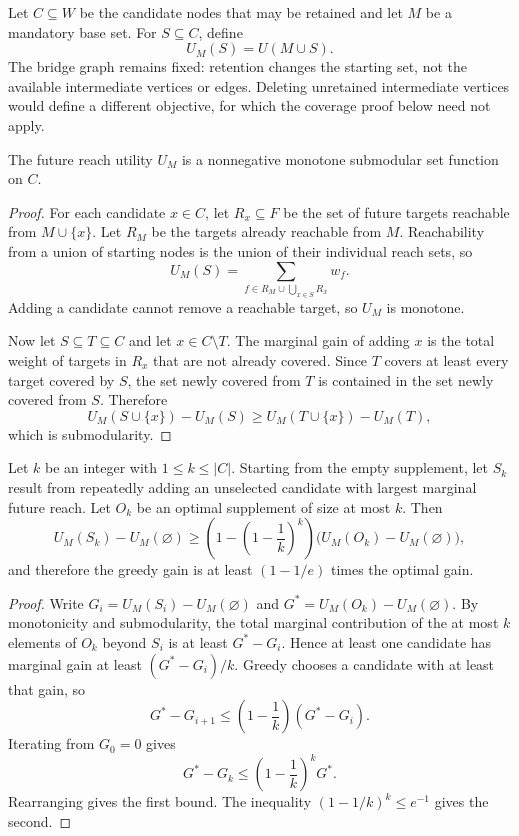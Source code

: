 Let $C\subseteq W$ be the candidate nodes that may be retained and let $M$ be a mandatory base set. For $S\subseteq C$, define
\[
U_M(S)=U(M\cup S).
\]
The bridge graph remains fixed: retention changes the starting set, not the available intermediate vertices or edges. Deleting unretained intermediate vertices would define a different objective, for which the coverage proof below need not apply.

\begin{PPTtheorem}
\label{PPT:res:14:1}
\label{PPT:thm:bridge-submodular}
The future reach utility $U_M$ is a nonnegative monotone submodular set function on $C$.
\end{PPTtheorem}

\begin{proof}
For each candidate $x\in C$, let $R_x\subseteq F$ be the set of future targets reachable from $M\cup\{x\}$. Let $R_M$ be the targets already reachable from $M$. Reachability from a union of starting nodes is the union of their individual reach sets, so
\[
U_M(S)=
\sum_{f\in R_M\cup\bigcup_{x\in S}R_x}w_f.
\]
Adding a candidate cannot remove a reachable target, so $U_M$ is monotone.

Now let $S\subseteq T\subseteq C$ and let $x\in C\setminus T$. The marginal gain of adding $x$ is the total weight of targets in $R_x$ that are not already covered. Since $T$ covers at least every target covered by $S$, the set newly covered from $T$ is contained in the set newly covered from $S$. Therefore
\[
U_M(S\cup\{x\})-U_M(S)
\ge
U_M(T\cup\{x\})-U_M(T),
\]
which is submodularity.
\end{proof}

\begin{PPTtheorem}
\label{PPT:res:14:2}
\label{PPT:thm:bridge-greedy}
Let $k$ be an integer with $1\leq k\leq|C|$. Starting from the empty supplement, let $S_k$ result from repeatedly adding an unselected candidate with largest marginal future reach. Let $O_k$ be an optimal supplement of size at most $k$. Then
\[
U_M(S_k)-U_M(\varnothing)
\ge
\left(1-\left(1-\frac1k\right)^k\right)
\bigl(U_M(O_k)-U_M(\varnothing)\bigr),
\]
and therefore the greedy gain is at least $(1-1/e)$ times the optimal gain.
\end{PPTtheorem}

\begin{proof}
Write $G_i=U_M(S_i)-U_M(\varnothing)$ and $G^*=U_M(O_k)-U_M(\varnothing)$. By monotonicity and submodularity, the total marginal contribution of the at most $k$ elements of $O_k$ beyond $S_i$ is at least $G^*-G_i$. Hence at least one candidate has marginal gain at least $(G^*-G_i)/k$. Greedy chooses a candidate with at least that gain, so
\[
G^*-G_{i+1}
\le
\left(1-\frac1k\right)(G^*-G_i).
\]
Iterating from $G_0=0$ gives
\[
G^*-G_k
\le
\left(1-\frac1k\right)^kG^*.
\]
Rearranging gives the first bound. The inequality $(1-1/k)^k\le e^{-1}$ gives the second.
\end{proof}

